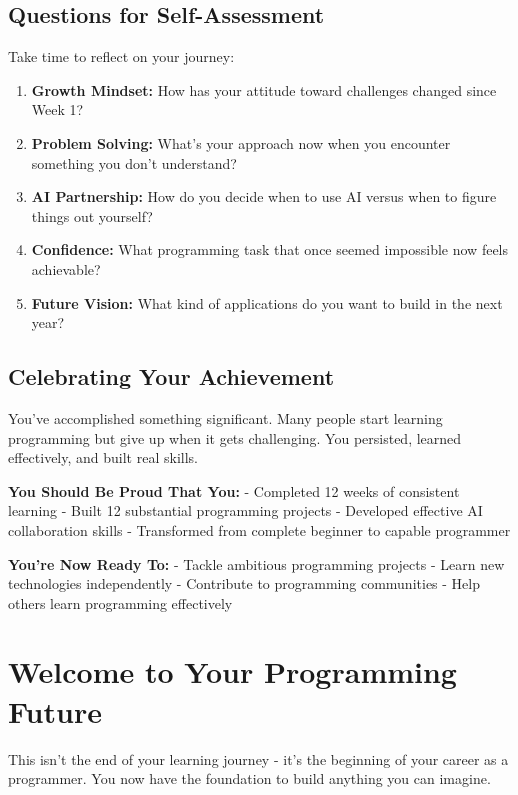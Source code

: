 \documentclass[
  letterpaper,
  DIV=11,
  numbers=noendperiod,
  oneside]{scrreprt}
\begin{document}
\subsection{Questions for
Self-Assessment}\label{questions-for-self-assessment}

Take time to reflect on your journey:

\begin{enumerate}
\def\labelenumi{\arabic{enumi}.}
\item
  \textbf{Growth Mindset:} How has your attitude toward challenges
  changed since Week 1?
\item
  \textbf{Problem Solving:} What's your approach now when you encounter
  something you don't understand?
\item
  \textbf{AI Partnership:} How do you decide when to use AI versus when
  to figure things out yourself?
\item
  \textbf{Confidence:} What programming task that once seemed impossible
  now feels achievable?
\item
  \textbf{Future Vision:} What kind of applications do you want to build
  in the next year?
\end{enumerate}

\subsection{Celebrating Your
Achievement}\label{celebrating-your-achievement}

You've accomplished something significant. Many people start learning
programming but give up when it gets challenging. You persisted, learned
effectively, and built real skills.

\textbf{You Should Be Proud That You:} - Completed 12 weeks of
consistent learning - Built 12 substantial programming projects -
Developed effective AI collaboration skills - Transformed from complete
beginner to capable programmer

\textbf{You're Now Ready To:} - Tackle ambitious programming projects -
Learn new technologies independently - Contribute to programming
communities - Help others learn programming effectively

\section{Welcome to Your Programming
Future}\label{welcome-to-your-programming-future}

This isn't the end of your learning journey - it's the beginning of your
career as a programmer. You now have the foundation to build anything
you can imagine.
\end{document}
